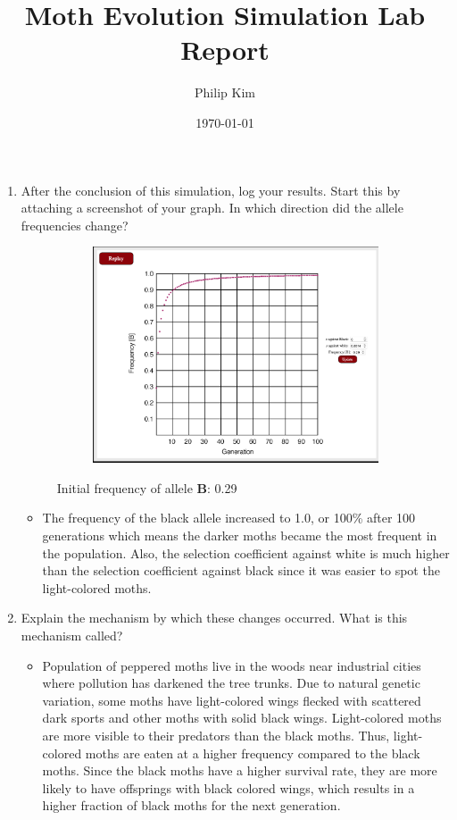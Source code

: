 \documentclass{article}
\title{Moth Evolution Simulation Lab Report}
\author{Philip Kim}
\date{\today}
\begin{document}
\maketitle
\begin{enumerate}
  \item After the conclusion of this simulation, log your results. Start this by attaching a screenshot of your graph. In which direction did the allele frequencies change?
  \begin{figure}[h!]
    \begin{center}
      \begin{subfigure}[b]{0.7\textwidth}
        \includegraphics[width=\textwidth]{white.png}
      \end{subfigure}
      \caption*{Initial frequency of allele \textbf{B}: 0.29}
    \end{center}
  \end{figure}
  \begin{itemize}
    \item The frequency of the black allele increased to 1.0, or 100\% after 100 generations which means the darker moths became the most frequent in the population. Also, the selection coefficient against white is much higher than the selection coefficient against black since it was easier to spot the light-colored moths.
  \end{itemize}
  \item Explain the mechanism by which these changes occurred. What is this mechanism called?
  \begin{itemize}
    \item Population of peppered moths live in the woods near industrial cities where pollution has darkened the tree trunks. Due to natural genetic variation, some moths have light-colored wings flecked with scattered dark sports and other moths with solid black wings. Light-colored moths are more visible to their predators than the black moths. Thus, light-colored moths are eaten at a higher frequency compared to the black moths. Since the black moths have a higher survival rate, they are more likely to have offsprings with black colored wings, which results in a higher fraction of black moths for the next generation.

\end{itemize}
\end{enumerate}
\end{document}
